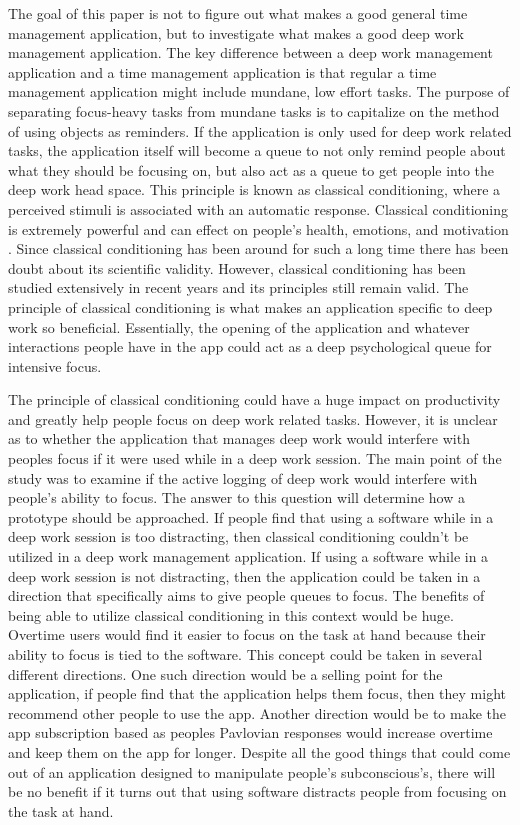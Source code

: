 \documentclass[sigconf]{acmart}
\begin{document}
    The goal of this paper is not to figure out what makes a good general time management application, but to investigate what makes a good deep work management application. The key difference between a deep work management application and a time management application is that regular a time management application  might include mundane, low effort tasks. The purpose of separating focus-heavy tasks from mundane tasks is to capitalize on the method of using objects as reminders. If the application is only used for deep work related tasks, the application itself will become a queue to not only remind people about what they should be focusing on, but also act as a queue to get people into the deep work head space. This principle is known as classical conditioning,  where a perceived stimuli is associated with an automatic response. Classical conditioning is extremely powerful and can effect on people's health, emotions, and motivation \cite{cond}. Since classical conditioning has been around for such a long time there has been doubt about its scientific validity. However, classical conditioning has been studied extensively in recent years and its principles still remain valid\cite{modern}. The principle of classical conditioning is what makes an application specific to deep work so beneficial. Essentially, the opening of the application and whatever interactions people have in the app could act as a deep psychological queue for intensive focus. 

    The principle of classical conditioning could have a huge impact on productivity and greatly help people focus on deep work related tasks. However, it is unclear as to whether the application that manages deep work would interfere with peoples focus if it were used while in a deep work session. The main point of the study was to examine if the active logging of deep work would interfere with people's ability to focus. The answer to this question will determine how a prototype should be approached. If people find that using a software while in a deep work session is too distracting, then classical conditioning couldn't be utilized in a deep work management application. If using a software while in a deep work session is not distracting, then the application could be taken in a direction that specifically aims to give people queues to focus. The benefits of being able to utilize classical conditioning in this context would be huge. Overtime users would find it easier to focus on the task at hand because their ability to focus is tied to the software. This concept could be taken in several different directions. One such direction would be a selling point for the application, if people find that the application helps them focus, then they might recommend other people to use the app. Another direction would be to make the app subscription based as peoples Pavlovian responses would increase overtime and keep them on the app for longer\cite{clas}. Despite all the good things that could come out of an application designed to manipulate people's subconscious's, there will be no benefit if it turns out that using software distracts people from focusing on the task at hand.
\end{document}
